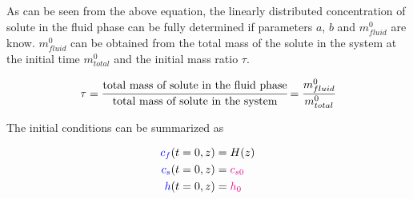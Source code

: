 \documentclass[../Article_Model_Parameters.tex]{subfiles}
\begin{document}
	As can be seen from the above equation, the linearly distributed concentration of solute in the fluid phase can be fully determined if parameters $a$, $b$ and $m_{fluid}^0$ are know. $m_{fluid}^0$ can be obtained from the total mass of the solute in the system at the initial time $m_{total}^0$ and the initial mass ratio $\tau$.
	
	{\footnotesize
		\begin{equation*}
			\tau = \cfrac{\text{total mass of solute in the fluid phase}}{\text{total mass of solute in the system}} = \cfrac{m^0_{fluid}}{m^0_{total}}
		\end{equation*}
	}

	The initial conditions can be summarized as

	{\footnotesize
		\begin{subequations}
			\begin{align*}
				{\color{blue}c_f}(t = 0, z) &= H(z)   \\
				{\color{blue}c_s}(t = 0, z) &= {\color{magenta}c_{s0}} \\
				{\color{blue}h}(t = 0, z) &= {\color{magenta}h_0}
			\end{align*}
	\end{subequations} }
\end{document}
